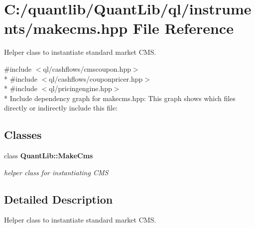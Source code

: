 \section{C\+:/quantlib/\+Quant\+Lib/ql/instruments/makecms.hpp File Reference}
\label{makecms_8hpp}


Helper class to instantiate standard market C\+MS.  


{\ttfamily \#include $<$ql/cashflows/cmscoupon.\+hpp$>$}\\*
{\ttfamily \#include $<$ql/cashflows/couponpricer.\+hpp$>$}\\*
{\ttfamily \#include $<$ql/pricingengine.\+hpp$>$}\\*
Include dependency graph for makecms.\+hpp\+:
This graph shows which files directly or indirectly include this file\+:
\subsection*{Classes}
\begin{DoxyCompactItemize}
\item 
class {\bf Quant\+Lib\+::\+Make\+Cms}
\begin{DoxyCompactList}\small\item\em helper class for instantiating C\+MS \end{DoxyCompactList}\end{DoxyCompactItemize}


\subsection{Detailed Description}
Helper class to instantiate standard market C\+MS. 

